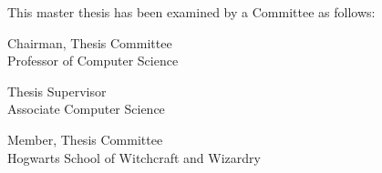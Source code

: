 
\begin{titlepage}
\begin{large}
This master thesis has been examined by a Committee as follows:

\signature{Professor Veronica Teichrieb}{Chairman, Thesis Committee \\
   Professor of Computer Science}

\signature{Professor Daniel Cunha}{Thesis Supervisor \\
   Associate Computer Science}

\signature{Professor Alvo Dumbledore}{Member, Thesis Committee \\
   Hogwarts School of Witchcraft and Wizardry}
\end{large}
\end{titlepage}

